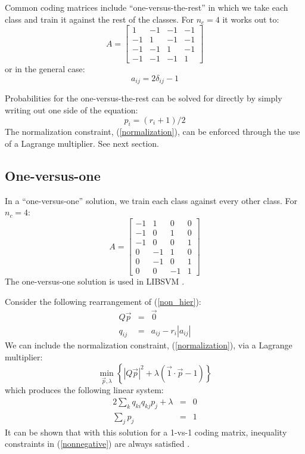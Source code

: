 \documentclass{article}
\newenvironment{eqnnon}{\begin{equation*}}{\end{equation*}}
\newenvironment{eqnarraynon}{\begin{eqnarray*}}{\end{eqnarray*}}
\begin{document}
\label{one_vs_rest}

Common coding matrices include ``one-versus-the-rest'' in which
we take each class and train it against the rest of the
classes.
For $n_c=4$ it works out to:
\begin{eqnnon}
A = 
\begin{bmatrix}
1 & -1 & -1 & -1 \\
-1 & 1 & -1 & -1 \\
-1 & -1 & 1 & -1 \\
-1 & -1 & -1 & 1
\end{bmatrix}
\end{eqnnon}
or in the general case:
\begin{eqnnon}
	a_{ij}=2 \delta_{ij}-1
\end{eqnnon}

Probabilities for the one-versus-the-rest can be solved for directly by
simply writing out one side of the equation:
\begin{eqnnon}
	p_i = (r_i + 1)/2
\end{eqnnon}
The normalization constraint, (\ref{normalization}), can be enforced 
through the use of a Lagrange multiplier. See next section.

\subsection{One-versus-one}

\label{one_vs_one}

In a ``one-versus-one'' solution, we train each class against
every other class. For $n_c=4$:
\begin{eqnnon}
A = 
\begin{bmatrix}
-1 & 1 & 0 & 0 \\
-1 & 0 & 1 & 0 \\
-1 & 0 & 0 & 1 \\
0 & -1 & 1 & 0 \\
0 & -1 & 0 & 1 \\
0 & 0 & -1 & 1
\end{bmatrix}
\end{eqnnon}
The one-versus-one solution is used in LIBSVM \citep{Chang_Lin2011}.

Consider the following rearrangement of (\ref{non_hier}):
\begin{eqnarraynon}
	Q \vec p & = & \vec 0 \\
	q_{ij} & = & a_{ij} - r_i |a_{ij}|
\end{eqnarraynon}
We can include the normalization constraint, (\ref{normalization}), via
a Lagrange multiplier:
\begin{eqnnon}
	\min_{\vec p, \lambda} \left \lbrace | Q \vec p |^2 + \lambda(\vec 1 \cdot \vec p - 1) \right \rbrace
\end{eqnnon}
which produces the following linear system:
\begin{eqnarraynon}
	2 \sum_k q_{ki} q_{kj} p_j + \lambda & = & 0 \\
	\sum_j p_j & = & 1
\end{eqnarraynon}
It can be shown that with this solution for a 1-vs-1 coding matrix,
inequality constraints in (\ref{nonnegative}) are always satisfied
\citep{Wu_etal2004}.
\end{document}
